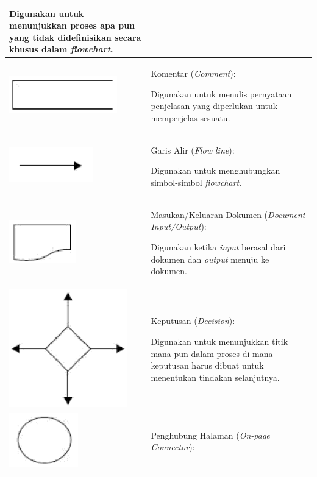 \begin{longtable}[c]{|>{\centering}m{4cm}|>{\raggedright}m{9.5cm}|}
Digunakan untuk menunjukkan proses apa pun yang tidak didefinisikan
secara khusus dalam \emph{flowchart}.\tabularnewline
\hline 
\includegraphics[totalheight=1cm]{images/flow_comm} & Komentar (\emph{Comment}):

Digunakan untuk menulis pernyataan penjelasan yang diperlukan untuk
memperjelas sesuatu.\tabularnewline
\hline 
\includegraphics[totalheight=1.5cm]{images/flow_fl} & Garis Alir (\emph{Flow line}):

Digunakan untuk menghubungkan simbol-simbol \emph{flowchart}.\tabularnewline
\hline 
\includegraphics[totalheight=1.5cm]{images/flow_docio} & Masukan/Keluaran Dokumen (\emph{Document Input/Output}):

Digunakan ketika \emph{input} berasal dari dokumen dan \emph{output}
menuju ke dokumen.\tabularnewline
\hline 
\includegraphics[totalheight=1.8cm]{images/flow_deci} & Keputusan (\emph{Decision}):

Digunakan untuk menunjukkan titik mana pun dalam proses di mana keputusan
harus dibuat untuk menentukan tindakan selanjutnya.\tabularnewline
\hline 
\includegraphics[totalheight=1.7cm]{images/flow_oncon} & Penghubung Halaman (\emph{On-page Connector}):


\end{longtable}
